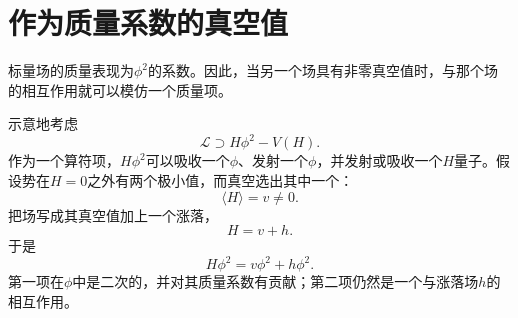 \section{作为质量系数的真空值}

标量场的质量表现为\(\phi^2\)的系数。因此，当另一个场具有非零真空值时，与那个场的相互作用就可以模仿一个质量项。

\begin{classroomqa}
\end{classroomqa}

示意地考虑
\begin{equation}
\mathcal L\supset H\phi^2-V(H).
\end{equation}
作为一个算符项，\(H\phi^2\)可以吸收一个\(\phi\)、发射一个\(\phi\)，并发射或吸收一个\(H\)量子。假设势在\(H=0\)之外有两个极小值，而真空选出其中一个：
\begin{equation}
\langle H\rangle=v\ne0.
\end{equation}
把场写成其真空值加上一个涨落，
\begin{equation}
H=v+h.
\end{equation}
于是
\begin{equation}
H\phi^2=v\phi^2+h\phi^2.
\end{equation}
第一项在\(\phi\)中是二次的，并对其质量系数有贡献；第二项仍然是一个与涨落场\(h\)的相互作用。

\begin{classroomqa}
\end{classroomqa}
